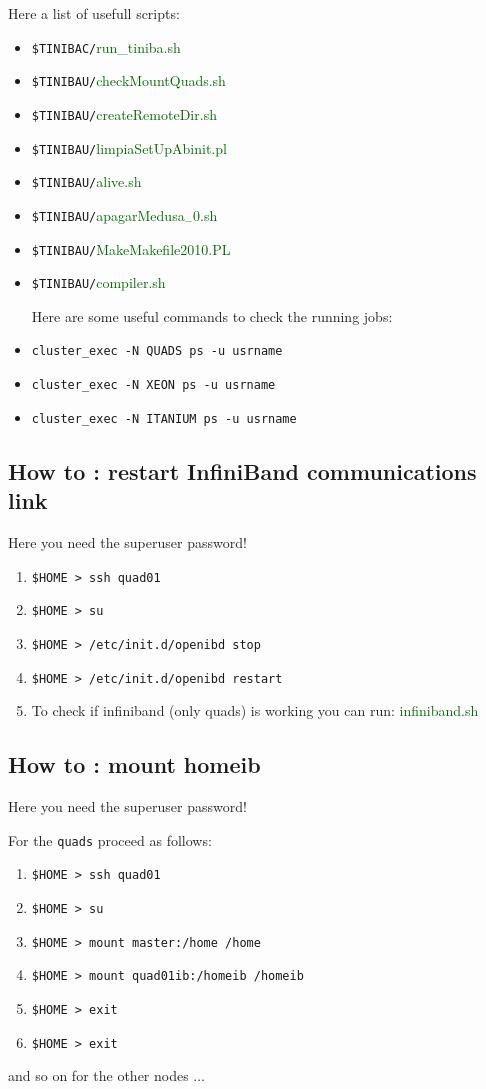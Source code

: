 \documentclass[12pt]{article}
\numberwithin{equation}{section}
\begin{document}
Here a list of usefull scripts:
\begin{itemize}
\item \verb=$TINIBAC/=\textcolor{darkgreen}{run\_tiniba.sh}
\item \verb=$TINIBAU/=\textcolor{darkgreen}{checkMountQuads.sh}
\item \verb=$TINIBAU/=\textcolor{darkgreen}{createRemoteDir.sh}
\item \verb=$TINIBAU/=\textcolor{darkgreen}{limpiaSetUpAbinit.pl}
\item \verb=$TINIBAU/=\textcolor{darkgreen}{alive.sh}
\item \verb=$TINIBAU/=\textcolor{darkgreen}{apagarMedusa$_{-}0$.sh}
\item \verb=$TINIBAU/=\textcolor{darkgreen}{MakeMakefile2010.PL}
\item \verb=$TINIBAU/=\textcolor{darkgreen}{compiler.sh}

Here are some useful commands to check the running jobs:
\item \verb=cluster_exec -N QUADS ps -u usrname=
\item \verb=cluster_exec -N XEON ps -u usrname=
\item \verb=cluster_exec -N ITANIUM ps -u usrname=
\end{itemize} 
\subsection{How to : restart InfiniBand communications link }
Here you need the superuser password! 
\begin{enumerate}
\item \verb=$HOME > ssh quad01=  
\item \verb=$HOME > su=
\item \verb=$HOME > /etc/init.d/openibd stop=
\item \verb=$HOME > /etc/init.d/openibd restart=
\item To check if infiniband (only quads) is working you can run:
\textcolor{darkgreen}{infiniband.sh}
\end{enumerate}
\subsection{How to : mount  homeib}
Here you need the superuser password!  

For the \verb=quads= proceed as follows:
\begin{enumerate}
\item \verb=$HOME > ssh quad01=  
\item \verb=$HOME > su=
\item \verb=$HOME > mount master:/home /home=
\item \verb=$HOME > mount quad01ib:/homeib /homeib=
\item \verb=$HOME > exit=
\item \verb=$HOME > exit=
\end{enumerate}
and so on for the other nodes $\ldots$
\end{document}
